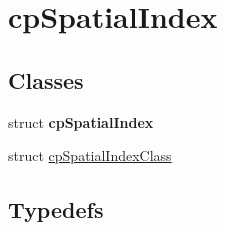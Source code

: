 \hypertarget{group__cp_spatial_index}{\section{cp\-Spatial\-Index}
\label{group__cp_spatial_index}
}
\subsection*{Classes}
\begin{DoxyCompactItemize}
\item 
struct {\bfseries cp\-Spatial\-Index}
\item 
struct \hyperlink{structcp_spatial_index_class}{cp\-Spatial\-Index\-Class}
\end{DoxyCompactItemize}
\subsection*{Typedefs}
